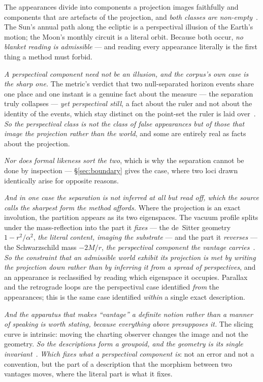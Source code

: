 \documentclass[11pt,a4paper]{article}
\theoremstyle{plain}
\theoremstyle{definition}
\begin{document}
The appearances divide into components a projection images faithfully and components that are artefacts of
the projection, and \emph{both classes are non-empty}~\cite{JanzenShadowExistence}. The Sun's annual path
along the ecliptic is a perspectival illusion of the Earth's motion; the Moon's monthly circuit is a literal
orbit. Because both occur, \emph{no blanket reading is admissible} --- and reading every appearance literally
is the first thing a method must forbid.

\emph{A perspectival component need not be an illusion, and the corpus's own case is the sharp one.} The
metric's verdict that two null-separated horizon events share one place and one instant is a genuine fact
about the measure --- the separation truly collapses --- \emph{yet perspectival still}, a fact about the ruler
and not about the identity of the events, which stay distinct on the point-set the ruler is laid
over~\cite{JanzenBHcausality}. \emph{So the perspectival class is not the class of false appearances but of
those that image the projection rather than the world}, and some are entirely real as facts about the
projection.

\emph{Nor does formal likeness sort the two}, which is why the separation cannot be done by inspection ---
\S\ref{sec:boundary} gives the case, where two loci drawn identically arise for opposite reasons.

\emph{And in one case the separation is not inferred at all but read off, which the source calls the sharpest
form the method affords.} Where the projection is an exact involution, the partition appears as its two
eigenspaces. The vacuum profile splits under the mass-reflection into the part it \emph{fixes} --- the
de~Sitter geometry $1-r^{2}/\alpha^{2}$, \emph{the literal content, imaging the substrate} --- and the part
it \emph{reverses} --- the Schwarzschild mass $-2M/r$, \emph{the perspectival component the vantage
carries}~\cite{JanzenGroupoid,JanzenShadowExistence}. \emph{So the constraint that an admissible world exhibit
its projection is met by writing the projection down rather than by inferring it from a spread of
perspectives}, and an appearance is reclassified by reading which eigenspace it occupies. Parallax and the
retrograde loops are the perspectival case identified \emph{from} the appearances; this is the same case
identified \emph{within} a single exact description.

\emph{And the apparatus that makes ``vantage'' a definite notion rather than a manner of speaking is worth
stating, because everything above presupposes it.} The slicing curve is intrinsic: moving the charting
observer changes the image and not the geometry. \emph{So the descriptions form a groupoid, and the geometry is its single
invariant}~\cite{JanzenGroupoid}. \emph{Which fixes what a perspectival component is}: not an error and not a
convention, but the part of a description that the morphism between two vantages moves, where the literal
part is what it fixes.
\end{document}
